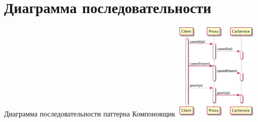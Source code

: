 \documentclass[PI,LAB]{HSEUniversity}
\begin{document}
    \section{Диаграмма последовательности }
  
	\begin{FIGURE}[h]{Диаграмма последовательности паттерна Компоновщик\label{fig:example-figure}}
		\includegraphics[width=0.3\textwidth]{../out/diagrams/builder-seq/compactor-seq}
	\end{FIGURE}


   
\end{document}
